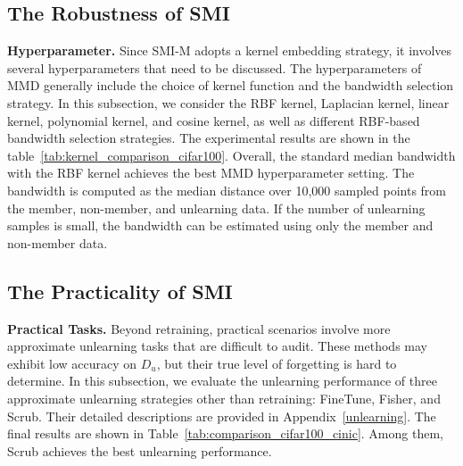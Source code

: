 \documentclass{article}
\theoremstyle{plain}
\theoremstyle{definition}
\theoremstyle{remark}
\begin{document}
\subsection{The Robustness of SMI}
\textbf{Hyperparameter.} Since SMI-M adopts a kernel embedding strategy, it involves several hyperparameters that need to be discussed. The hyperparameters of MMD generally include the choice of kernel function and the bandwidth selection strategy. In this subsection, we consider the RBF kernel, Laplacian kernel, linear kernel, polynomial kernel, and cosine kernel, as well as different RBF-based bandwidth selection strategies. The experimental results are shown in the table~\ref{tab:kernel_comparison_cifar100}. Overall, the standard median bandwidth with the RBF kernel achieves the best MMD hyperparameter setting. The bandwidth is computed as the median distance over 10,000 sampled points from the member, non-member, and unlearning data. If the number of unlearning samples is small, the bandwidth can be estimated using only the member and non-member data.
\begin{table}[t]
\centering
\caption{Relationship between different kernels and the performance of SMI-M. Values in parentheses denote the multiplier applied to the median bandwidth. }
\label{tab:kernel_comparison_cifar100}
\end{table}
\subsection{The Practicality of SMI}
\textbf{Practical Tasks.}
Beyond retraining, practical scenarios involve more approximate unlearning tasks that are difficult to audit. These methods may exhibit low accuracy on $D_u$, but their true level of forgetting is hard to determine. In this subsection, we evaluate the unlearning performance of three approximate unlearning strategies other than retraining: FineTune, Fisher, and Scrub. Their detailed descriptions are provided in Appendix~\ref{unlearning}. The final results are shown in Table~\ref{tab:comparison_cifar100_cinic}. Among them, Scrub achieves the best unlearning performance.
\end{document}
